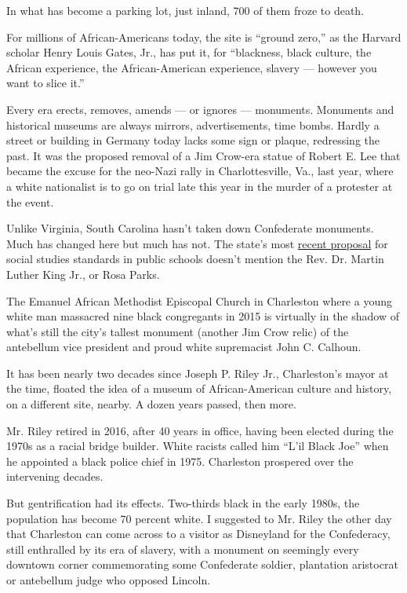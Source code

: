 In what has become a parking lot, just inland, 700 of them froze to
death.

For millions of African-Americans today, the site is ``ground zero,'' as
the Harvard scholar Henry Louis Gates, Jr., has put it, for ``blackness,
black culture, the African experience, the African-American experience,
slavery --- however you want to slice it.''

Every era erects, removes, amends --- or ignores --- monuments.
Monuments and historical museums are always mirrors, advertisements,
time bombs. Hardly a street or building in Germany today lacks some sign
or plaque, redressing the past. It was the proposed removal of a Jim
Crow-era statue of Robert E. Lee that became the excuse for the neo-Nazi
rally in Charlottesville, Va., last year, where a white nationalist is
to go on trial late this year in the murder of a protester at the event.

Unlike Virginia, South Carolina hasn't taken down Confederate monuments.
Much has changed here but much has not. The state's most
\href{https://www.postandcourier.com/news/proposed-s-c-social-studies-standards-don-t-mention-mlk/article_8492b92c-075d-11e8-bfaa-0fa934b57487.html}{recent
proposal} for social studies standards in public schools doesn't mention
the Rev. Dr. Martin Luther King Jr., or Rosa Parks.

The Emanuel African Methodist Episcopal Church in Charleston where a
young white man massacred nine black congregants in 2015 is virtually in
the shadow of what's still the city's tallest monument (another Jim Crow
relic) of the antebellum vice president and proud white supremacist John
C. Calhoun.

It has been nearly two decades since Joseph P. Riley Jr., Charleston's
mayor at the time, floated the idea of a museum of African-American
culture and history, on a different site, nearby. A dozen years passed,
then more.

Mr. Riley retired in 2016, after 40 years in office, having been elected
during the 1970s as a racial bridge builder. White racists called him
``L'il Black Joe'' when he appointed a black police chief in 1975.
Charleston prospered over the intervening decades.

But gentrification had its effects. Two-thirds black in the early 1980s,
the population has become 70 percent white. I suggested to Mr. Riley the
other day that Charleston can come across to a visitor as Disneyland for
the Confederacy, still enthralled by its era of slavery, with a monument
on seemingly every downtown corner commemorating some Confederate
soldier, plantation aristocrat or antebellum judge who opposed Lincoln.

